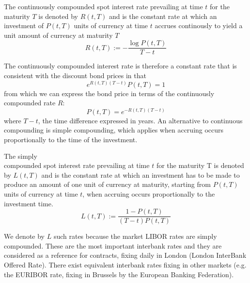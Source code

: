 \begin{defn} The
  continuously compounded spot interest rate prevailing at
  time $t$ for   the maturity $T$ is denoted by $R(t,T)$ and is the
  constant rate at which an investment of $P(t,T)$ units of currency
  at time $t$ accrues continously to yield a unit amount of currency
  at maturity $T$ 
\begin{equation}
\label{eq:CCRateDef}
R(t,T):=-\frac{\log P(t,T)}{T-t}
\end{equation}
\end{defn}
The continuously compounded interest rate is therefore a constant rate
that is consistent with the discount bond prices in that
\begin{equation}
\label{eq:CCRateAccruing}
e^{R(t,T)(T-t)} P(t,T)=1
\end{equation}
from which we can express the bond price in terms of the continuously
compounded rate $R$:
\begin{equation}
\label{eq:ZCfromCCRate}
P(t,T)= e^{-R(t,T)(T-t)} 
\end{equation}
where $T-t$, the time difference expressed in years. An
alternative to continuous compounding is simple compounding, which
applies when accruing occurs proportionally to the time of the
investment. 
\begin{defn} 
 The simply \\compounded spot interest rate prevailing at time
 $t$ for the maturity T is denoted by $L(t,T)$ and is the constant
 rate at which an investment has to be made to produce an amount of
 one unit of currency at maturity, starting from $P(t,T)$ units of
 currency at time $t$, when accruing occurs proportionally to the
 investment time. 
\begin{equation}
\label{eq:SCRateDef}
L(t,T):=\frac{1-P(t,T)}{(T-t) P(t,T)}
\end{equation}
\end{defn}
We denote by $L$ such rates because the market LIBOR rates are
simply compounded. These are the most important interbank rates and
they are considered as a reference for contracts, fixing daily in
London (London InterBank Offered Rate). There exist equivalent
interbank rates fixing in other markets (e.g. the EURIBOR rate, fixing
in Brussels by the European Banking Federation). 

